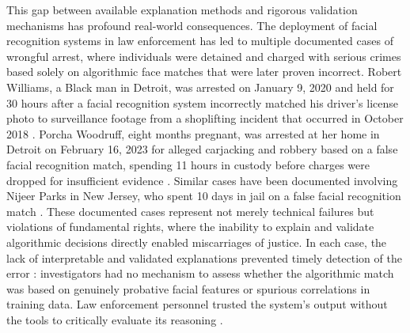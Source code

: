 This gap between available explanation methods and rigorous validation mechanisms has profound real-world consequences. The deployment of facial recognition systems in law enforcement has led to multiple documented cases of wrongful arrest, where individuals were detained and charged with serious crimes based solely on algorithmic face matches that were later proven incorrect. Robert Williams, a Black man in Detroit, was arrested on January 9, 2020 and held for 30 hours after a facial recognition system incorrectly matched his driver's license photo to surveillance footage from a shoplifting incident that occurred in October 2018 \cite{hill2020detroit}. Porcha Woodruff, eight months pregnant, was arrested at her home in Detroit on February 16, 2023 for alleged carjacking and robbery based on a false facial recognition match, spending 11 hours in custody before charges were dropped for insufficient evidence \cite{hill2023pregnant}. Similar cases have been documented involving Nijeer Parks in New Jersey, who spent 10 days in jail on a false facial recognition match \cite{parks2019wrongful}. These documented cases \cite{parks2019wrongful,hill2020detroit,hill2023pregnant} represent not merely technical failures but violations of fundamental rights, where the inability to explain and validate algorithmic decisions directly enabled miscarriages of justice. In each case, the lack of interpretable and validated explanations prevented timely detection of the error \cite{nrc2009strengthening,Leslie2020_BiasFaceRecognition}: investigators had no mechanism to assess whether the algorithmic match was based on genuinely probative facial features or spurious correlations in training data. Law enforcement personnel trusted the system's output without the tools to critically evaluate its reasoning \cite{garvie2016perpetual}.

